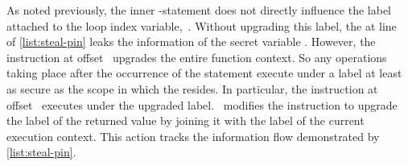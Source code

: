 As noted previously, the inner -statement does not directly influence the label attached to the loop index variable,~.
Without upgrading this label, the  at line~ of \autoref{list:steal-pin} leaks the information of the secret variable .
However, the \popj instruction at offset~ upgrades the entire function context.
So any operations taking place after the occurrence of the  statement execute under a label at least as secure as the scope in which the  resides.
In particular, the  instruction at offset~ executes under the upgraded label.
\FlowCore\ modifies the  instruction to upgrade the label of the returned value by joining it with the label of the current execution context.
This action tracks the information flow demonstrated by \autoref{list:steal-pin}.



